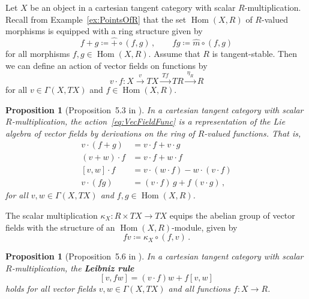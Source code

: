 \documentclass[12pt,reqno, a4paper]{amsart}
\numberwithin{equation}{section}
\theoremstyle{plain}
\newtheorem{Proposition}[Theorem]{Proposition}
\theoremstyle{definition}
\theoremstyle{remark}
\DeclareMathOperator{\Hom}{Hom}
\newcommand{\Val}{\eta}
\newcommand{\Rmult}{\hat{m}}
\newcommand{\Radd}{\hat{+}}
\newcommand{\Runit}{\hat{1}}
\newcommand{\Rzero}{\hat{0}}
\begin{document}
Let $X$ be an object in a cartesian tangent category with scalar $R$-multiplication. Recall from Example~\ref{ex:PointsOfR} that the set $\Hom(X,R)$ of $R$-valued morphisms is equipped with a ring structure given by
\begin{equation*}
  f + g \coloneqq \Radd \circ (f,g)
  \,,\qquad
  fg \coloneqq \Rmult \circ (f,g)
\end{equation*}
for all morphisms $f, g \in \Hom(X,R)$.
Assume that $R$ is tangent-stable. Then we can define an action of vector fields on functions by
\begin{equation}
\label{eq:VecFieldFunc}
  v \cdot f: X \xrightarrow{~v~}
  TX \xrightarrow{~Tf~} TR \xrightarrow{~\Val_R~}
  R
\end{equation}
for all $v \in \Gamma(X,TX)$ and $f \in \Hom(X,R)$.

\begin{Proposition}[Proposition~5.3 in \cite{AintablianBlohmann:2026}]
\label{prop:VecActFunc}
In a cartesian tangent category with scalar $R$-multiplication, the action~\eqref{eq:VecFieldFunc} is a representation of the Lie algebra of vector fields by derivations on the ring of $R$-valued functions. That is,
\begin{subequations}
\begin{align}
\label{eq:VecActFuncA}
  v \cdot (f + g)
  &= v \cdot f + v \cdot g
  \\
\label{eq:VecActFuncB}
  (v+w) \cdot f
  &=
  v \cdot f + w \cdot f
  \\
\label{eq:VecActFunc1}
  [v,w] \cdot f
  &= v \cdot (w \cdot f) - w \cdot (v \cdot f)
  \\
\label{eq:VecActFunc2}
  v \cdot (fg)
  &= (v \cdot f)\,g + f\,(v \cdot g)
  \,,
\end{align}
\end{subequations}
for all $v, w \in \Gamma(X,TX)$ and $f,g \in \Hom(X,R)$.
\end{Proposition}

The scalar multiplication $\kappa_X: R \times TX \to TX$ equips the abelian group of vector fields with the structure of an $\Hom(X,R)$-module, given by
\begin{equation}
\label{eq:fvDef}
  fv \coloneqq \kappa_X \circ (f,v)
  \,.
\end{equation}

\begin{Proposition}[Proposition~5.6 in \cite{AintablianBlohmann:2026}]
\label{prop:LeibnizRule}
In a cartesian tangent category with scalar $R$-multiplication, the \textbf{Leibniz rule}
\begin{equation}
\label{eq:LeibnizRule}
  [v,fw] = (v \cdot f)w + f[v,w]
\end{equation}
holds for all vector fields $v, w \in \Gamma(X,TX)$ and all functions $f: X \to R$.
\end{Proposition}
\end{document}
